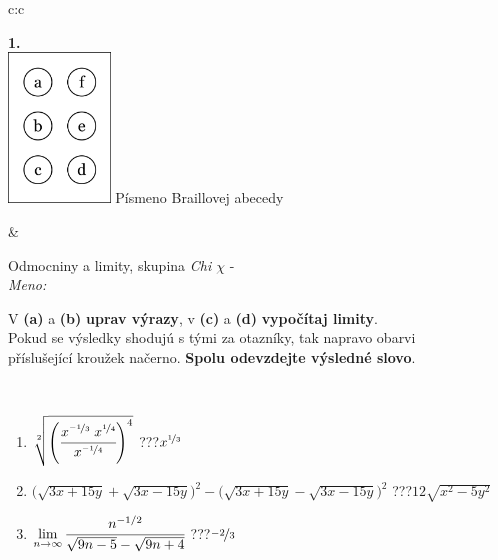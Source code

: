 \documentclass[10pt]{report}
\begin{document}
\begin{tabular}{c:c}
\begin{minipage}[c][104.5mm][t]{0.5\linewidth}
\begin{center}
\begin{minipage}{0.20\linewidth}
\begin{center}
{\Huge\bfseries 1.} \\[2mm]
\includegraphics[height=40mm]{../images/braille.png}
{\small Písmeno Braillovej abecedy}
\end{center}
\end{minipage}
\end{center}
\end{minipage}
&
\begin{minipage}[c][104.5mm][t]{0.5\linewidth}
\begin{center}
\vspace{7mm}
{\huge Odmocniny a limity, skupina \textit{Chi $\chi$} -}\\[5mm]
\textit{Meno:}\phantom{xxxxxxxxxxxxxxxxxxxxxxxxxxxxxxxxxxxxxxxxxxxxxxxxxxxxxxxxxxxxxxxxx}\\[5mm]
\begin{minipage}{0.95\linewidth}
\begin{center}
V \textbf{(a)} a \textbf{(b)} \textbf{uprav výrazy}, v \textbf{(c)} a \textbf{(d)} \textbf{vypočítaj limity}.\\Pokud se výsledky shodujú s tými za otazníky, tak napravo obarvi\\příslušející kroužek načerno. \textbf{Spolu odevzdejte výsledné slovo}.
\end{center}
\end{minipage}
\\[1mm]
\begin{minipage}{0.79\linewidth}
\begin{center}
\begin{varwidth}{\linewidth}
\begin{enumerate}
\small
\item $\sqrt[2]{\left(\cfrac{x^{\nicefrac{-1}{3}}\;x^{\nicefrac{1}{4}}}{x^{\nicefrac{-1}{4}}}\right)^{4}}$\quad \dotfill\; ???\;\dotfill \quad $x^{\nicefrac{1}{3}}$
\item {\footnotesize{\scriptsize$\big(\sqrt{3x+15y}+\sqrt{3x-15y}\big)^2-\big(\sqrt{3x+15y}-\sqrt{3x-15y}\big)^2$}\quad \dotfill\; ???\;\dotfill \quad $12\sqrt{x^2-5y^2}$}
\item $\lim\limits_{n\to\infty}\cfrac{n^{-1/2}}{\sqrt{9n-5}-\sqrt{9n+4}}$\quad \dotfill\; ???\;\dotfill \quad $\nicefrac{-2}{3}$

\end{enumerate}
\end{varwidth}
\end{center}
\end{minipage}
\end{center}
\end{minipage}
\end{tabular}
\end{document}

